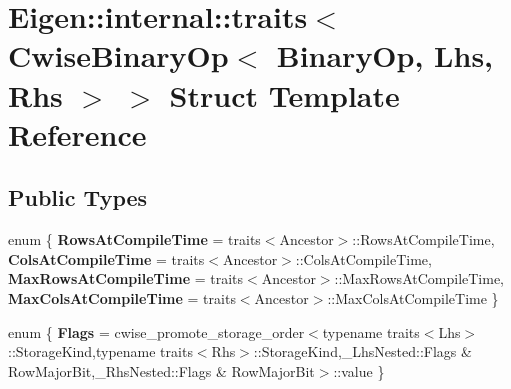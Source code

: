 \hypertarget{struct_eigen_1_1internal_1_1traits_3_01_cwise_binary_op_3_01_binary_op_00_01_lhs_00_01_rhs_01_4_01_4}{}\section{Eigen\+:\+:internal\+:\+:traits$<$ Cwise\+Binary\+Op$<$ Binary\+Op, Lhs, Rhs $>$ $>$ Struct Template Reference}
\label{struct_eigen_1_1internal_1_1traits_3_01_cwise_binary_op_3_01_binary_op_00_01_lhs_00_01_rhs_01_4_01_4}
\subsection*{Public Types}
\begin{DoxyCompactItemize}
\item 
\mbox{\label{struct_eigen_1_1internal_1_1traits_3_01_cwise_binary_op_3_01_binary_op_00_01_lhs_00_01_rhs_01_4_01_4_a8066d721e77dbc545c6a5fc5248ad50e}} 
enum \{ {\bfseries Rows\+At\+Compile\+Time} = traits$<$Ancestor$>$\+:\+:Rows\+At\+Compile\+Time, 
{\bfseries Cols\+At\+Compile\+Time} = traits$<$Ancestor$>$\+:\+:Cols\+At\+Compile\+Time, 
{\bfseries Max\+Rows\+At\+Compile\+Time} = traits$<$Ancestor$>$\+:\+:Max\+Rows\+At\+Compile\+Time, 
{\bfseries Max\+Cols\+At\+Compile\+Time} = traits$<$Ancestor$>$\+:\+:Max\+Cols\+At\+Compile\+Time
 \}
\item 
\mbox{\label{struct_eigen_1_1internal_1_1traits_3_01_cwise_binary_op_3_01_binary_op_00_01_lhs_00_01_rhs_01_4_01_4_abd4275554b12bc5af68d683406b4c803}} 
enum \{ {\bfseries Flags} = cwise\+\_\+promote\+\_\+storage\+\_\+order$<$typename traits$<$Lhs$>$\+:\+:Storage\+Kind,typename traits$<$Rhs$>$\+:\+:Storage\+Kind,\+\_\+\+Lhs\+Nested\+:\+:Flags \& Row\+Major\+Bit,\+\_\+\+Rhs\+Nested\+:\+:Flags \& Row\+Major\+Bit$>$\+:\+:value
 \}
\item 
\mbox{\label{struct_eigen_1_1internal_1_1traits_3_01_cwise_binary_op_3_01_binary_op_00_01_lhs_00_01_rhs_01_4_01_4_a723966fd6357098616c257cba44153bc}} 

\end{DoxyCompactItemize}
